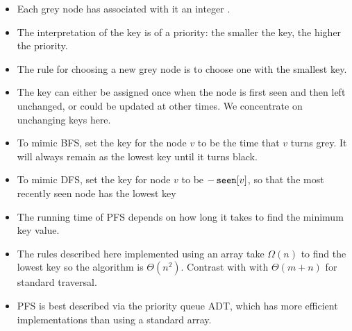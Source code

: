\begin{itemize}
	\item Each grey node has associated with it an integer . 
	\item The interpretation of the key is of a priority: 
	the smaller the key, the higher the priority. 
	\item The rule for choosing a new grey node is to choose one with the smallest key.  
	\item The key can either be assigned once when the node is first seen and then left unchanged, 
	or could be updated at other times. We concentrate on unchanging keys here.
	\item To mimic BFS, set the key for the node $v$ to be the time that $v$ turns grey. 
	It will always remain as the lowest key until it turns black.
	\item To mimic DFS, set the key for node $v$ to be $-\operatorname{\text{\texttt{seen}}}[v]$, 
	so that the most recently seen node has the lowest key
	\item The running time of PFS depends on how long it takes to find the minimum key value.
	\item The rules described here implemented using an array take $\Omega(n)$ to find the lowest key 
	so the algorithm is $\Theta(n^2)$. Contrast with with $\Theta(m+n)$ for standard traversal.
	\item PFS is best described via the priority queue ADT, 
	which has more efficient implementations than using a standard array.
\end{itemize}

%
%
%

